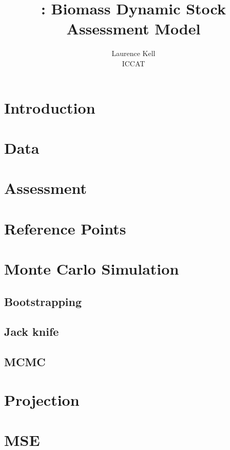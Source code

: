 \documentclass[shortnames,nojss,article]{jss}
\author{Laurence Kell\\ICCAT}
\title{\pkg{ASPIC}: Biomass Dynamic Stock Assessment Model}
\begin{document}




\section{Introduction}



\section{Data}

\section{Assessment}

\section{Reference Points}

\section{Monte Carlo Simulation}
\subsection{Bootstrapping}
\subsection{Jack knife}
\subsection{MCMC}

\section{Projection}

\section{MSE}
\end{document}
